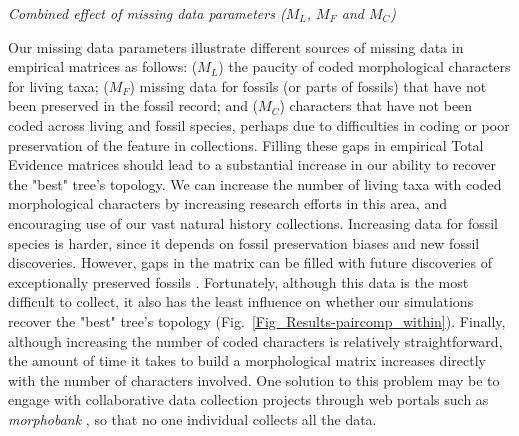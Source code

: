 \documentclass[12pt,letterpaper]{article}
\renewcommand{\subsection}[1]{%
\bigskip
\begin{center}
\begin{large}
\normalfont\itshape #1
\end{large}
\end{center}}
\begin{document}
\subsection{Combined effect of missing data parameters ($M_{L}$, $M_{F}$ and $M_{C}$)} 

Our missing data parameters illustrate different sources of missing data in empirical matrices as follows: ($M_{L}$) the paucity of coded morphological characters for living taxa; ($M_{F}$) missing data for fossils (or parts of fossils) that have not been preserved in the fossil record; and ($M_{C}$) characters that have not been coded across living and fossil species, perhaps due to difficulties in coding or poor preservation of the feature in collections. Filling these gaps in empirical Total Evidence matrices should lead to a substantial increase in our ability to recover the "best" tree's topology. We can increase the number of living taxa with coded morphological characters by increasing research efforts in this area, and encouraging use of our vast natural history collections. Increasing data for fossil species is harder, since it depends on fossil preservation biases and new fossil discoveries. However, gaps in the matrix can be filled with future discoveries of exceptionally preserved fossils \citep[e.g.][]{nithe2013}. Fortunately, although this data is the most difficult to collect, it also has the least influence on whether our simulations recover the "best" tree's topology (Fig.~\ref{Fig_Results-paircomp_within}). Finally, although increasing the number of coded characters is relatively straightforward, the amount of time it takes to build a morphological matrix increases directly with the number of characters involved. One solution to this problem may be to engage with collaborative data collection projects through web portals such as \textit{morphobank} \citep{morphobank}, so that no one individual collects all the data.
\end{document}
